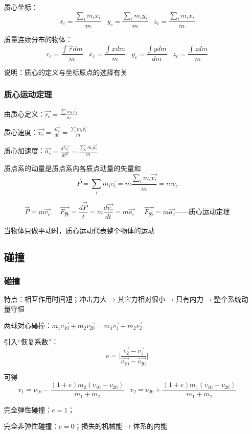 \documentclass[UTF8]{article}
\begin{document}
    质心坐标：\[x_c = \frac{\sum_i m_i x_i}{m}\;\;\;y_c = \frac{\sum_im_iy_i}{m}\;\;\;z_c = \frac{\sum_im_ix_i}{m}\]

    质量连续分布的物体：\[r_c = \frac{\int\vec{r}dm}{m}\;\;\;x_c = \frac{\int xdm}{m}\;\;\;y_c = \frac{\int ydm}{dm}\;\;\;z_c = \frac{\int zdm}{m}\]

    说明：质心的定义与坐标原点的选择有关

\subsubsection{质心运动定理}

    由质心定义：$\vec{r_c} = \frac{\sum m_i\vec r_i}{m}$
    
    质心速度：$\vec{v_c} = \frac{d\vec{r_c}}{dt} = \frac{\sum m_i\vec{v_i}}{m}$

    质心加速度：$\vec{a_c} = \frac{d^2\vec{r_c}}{dt^2} = \frac{\sum_i m_i\vec{a_i}}{m}$

    质点系的动量是质点系内各质点动量的矢量和
    \[\vec{P} = \sum_i m_i\vec{v_i} = m\frac{\sum_i m_i\vec{v_i}}{m} = mv_c\]

    \[\vec{P} = m\vec{v_c}\;\;\;\;\;\vec{F_{\mbox{外}}} = \frac{d\vec{P}}{t} = m\frac{d\vec{v_c}}{dt} = m\vec{a_c}\;\;\;\;\;\vec{F_{\mbox{外}}} = m\vec{a_c}\mbox{——质心运动定理}\]

    当物体只做平动时，质心运动代表整个物体的运动

\subsection{碰撞}

\subsubsection{碰撞}

    特点：相互作用时间短；冲击力大$\rightarrow$其它力相对很小$\rightarrow$只有内力$\rightarrow$整个系统动量守恒

    两球对心碰撞：$m_1\vec{v_{10}} + m_2\vec{v_{20}} = m_1\vec{v_1} + m_2\vec{v_2}$

    引入“恢复系数”：\[e = \lvert \frac{\vec{v_2} - \vec{v_1}}{\vec{v_{10}} - \vec{v_{20}}} \rvert\]

    可得\[v_1 = v_{10} - \frac{(1+e)m_2(v_{10} - v_{20})}{m_1 + m_2}\;\;\;v_2 = v_{20} + \frac{(1+e)m_1(v_{10} - v_{20})}{m_1 + m_2}\]

    完全弹性碰撞：$e = 1$；

    完全非弹性碰撞：$e = 0$；损失的机械能$\rightarrow$体系的内能
\end{document}

